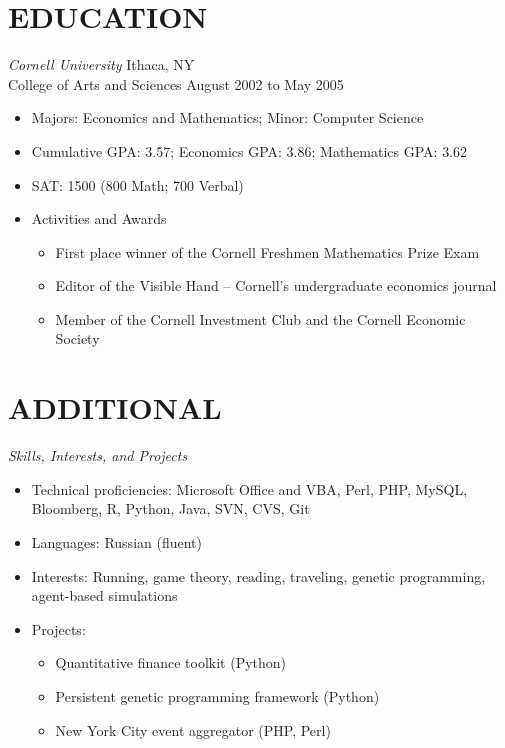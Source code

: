 \documentclass{res}
\begin{document}
\begin{resume}
\section{EDUCATION}
\vspace{1pt}
{\sl Cornell University} \hfill Ithaca, NY \\
College of Arts and Sciences \hfill August 2002 to May 2005
 \begin{itemize} \itemsep -2pt
  \item Majors: Economics and Mathematics; Minor: Computer Science
  \item Cumulative GPA: 3.57; Economics GPA: 3.86; Mathematics GPA: 3.62
  \item SAT: 1500 (800 Math; 700 Verbal)
  \item Activities and Awards \vspace{-6pt}
    \begin{itemize} \itemsep -1pt
    \item First place winner of the Cornell Freshmen Mathematics Prize Exam
    \item Editor of the Visible Hand – Cornell’s undergraduate economics journal
    \item Member of the Cornell Investment Club and the Cornell Economic Society
    \end{itemize} \vspace{0px}
\end{itemize} \vspace{0px}

\vspace{-6pt}
\section{ADDITIONAL} 
\vspace{1pt}
{\sl Skills, Interests, and Projects}
\begin{itemize} \itemsep -2pt
  \item Technical proficiencies: Microsoft Office and VBA, Perl, PHP, MySQL, Bloomberg, R, Python, Java, SVN, CVS, Git
  \item Languages: Russian (fluent)
  \item Interests: Running, game theory, reading, traveling, genetic programming, agent-based simulations
  \item Projects: \vspace{-6pt}
    \begin{itemize} \itemsep -2pt
    \item Quantitative finance toolkit (Python)
    \item Persistent genetic programming framework (Python)
    \item New York City event aggregator (PHP, Perl)
    \end{itemize} \vspace{0px}    
\end{itemize} \vspace{0px}

\end{resume} 
\end{document}
